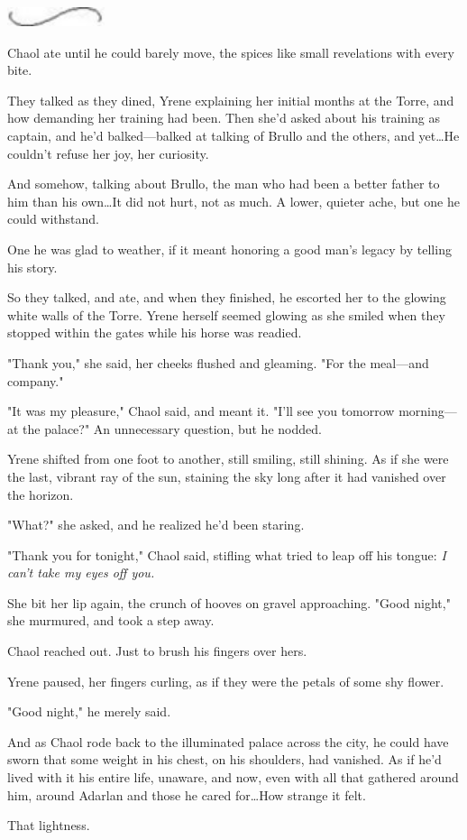 \begin{center}
	\includegraphics[width=1.12in,height=0.24in]{images/seperator}
\end{center}

Chaol ate until he could barely move, the spices like small revelations with every bite.

They talked as they dined, Yrene explaining her initial months at the Torre, and how demanding her training had been.
Then she'd asked about his training as captain, and he'd balked---balked at talking of Brullo and the others, and yet\ldots He couldn't refuse her joy, her curiosity.

And somehow, talking about Brullo, the man who had been a better father to him than his own\ldots It did not hurt, not as much.
A lower, quieter ache, but one he could withstand.

One he was glad to weather, if it meant honoring a good man's legacy by telling his story.

So they talked, and ate, and when they finished, he escorted her to the glowing white walls of the Torre.
Yrene herself seemed glowing as she smiled when they stopped within the gates while his horse was readied.

"Thank you," she said, her cheeks flushed and gleaming.
"For the meal---and company."

"It was my pleasure," Chaol said, and meant it.
"I'll see you tomorrow morning---at the palace?"
An unnecessary question, but he nodded.

Yrene shifted from one foot to another, still smiling, still shining.
As if she were the last, vibrant ray of the sun, staining the sky long after it had vanished over the horizon.

"What?"
she asked, and he realized he'd been staring.

"Thank you for tonight," Chaol said, stifling what tried to leap off his tongue: \emph{I can't take my eyes off you.}

She bit her lip again, the crunch of hooves on gravel approaching.
"Good night," she murmured, and took a step away.

Chaol reached out.
Just to brush his fingers over hers.

Yrene paused, her fingers curling, as if they were the petals of some shy flower.

"Good night," he merely said.

And as Chaol rode back to the illuminated palace across the city, he could have sworn that some weight in his chest, on his shoulders, had vanished.
As if he'd lived with it his entire life, unaware, and now, even with all that gathered around him, around Adarlan and those he cared for\ldots How strange it felt.

That lightness.

